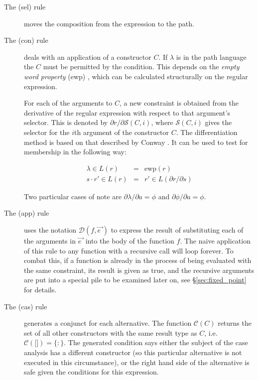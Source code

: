 \documentclass[book]{tfp05symp}
\newcommand{\T}[1]{\texttt{#1}}
\newcommand{\g}[1]{\{#1\}}
\newcommand{\D}{\ensuremath{\cdot}}
\newcommand{\vecto}[1]{\overrightarrow{#1\;}}
\begin{document}
\begin{description}

\item[The (sel) rule] moves the composition from the expression
to the path.

\item[The (con) rule] deals with an application of a constructor $C$.
If $\lambda$ is in the path language the $C$ must be permitted by
the condition. This depends on the \textit{empty word property}
(ewp) \cite{conway}, which can be calculated structurally on the
regular expression.

For each of the arguments to $C$, a new constraint is obtained from
the derivative of the regular expression with respect to that
argument's selector. This is denoted by $\partial r / \partial
\mathcal{S}(C,i)$, where $\mathcal{S}(C,i)$ gives the selector for
the $i$th argument of the constructor $C$. The differentiation
method is based on that described by Conway \cite{conway}. It can be
used to test for membership in the following way:

\[
\begin{array}{rcl}
\lambda \in L(r) & = & \text{ewp}(r) \\
s\D{}r' \in L(r) & = & r' \in L(\partial r / \partial s)
\end{array}
\]

Two particular cases of note are $\partial \lambda / \partial a =
\phi$ and $\partial \phi / \partial a = \phi$.

\item[The (app) rule] uses the notation $\mathcal{D}(f,\vecto{e})$ to
express the result of substituting each of the arguments in
$\vecto{e}$ into the body of the function $f$. The naive application
of this rule to any function with a recursive call will loop
forever. To combat this, if a function is already in the process of
being evaluated with the same constraint, its result is given as
true, and the recursive arguments are put into a special pile to be
examined later on, see \S\ref{sec:fixed_point} for details.

\item[The (cas) rule] generates a conjunct for each alternative.
The function $\mathcal{C}(C)$ returns the set of all other
constructors with the same result type as $C$, i.e.
$\mathcal{C}(\T{[]}) = \g{:}$. The generated condition says either
the subject of the case analysis has a different constructor (so
this particular alternative is not executed in this circumstance),
or the right hand side of the alternative is safe given the
conditions for this expression.
\end{description}
\end{document}
